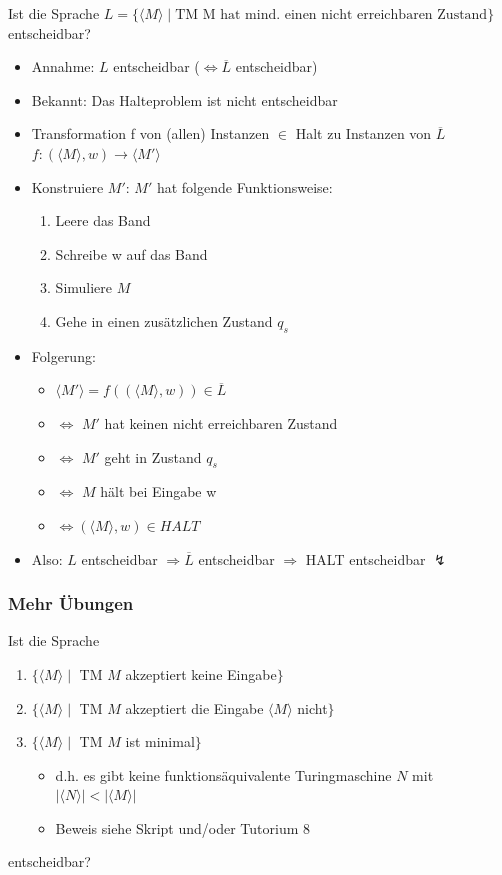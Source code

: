 \begin{frame}
\vspace{-1 cm}
Ist die Sprache $L=\{\langle M \rangle \mid \text{TM M hat mind. einen nicht erreichbaren Zustand}\}$ entscheidbar?
\begin{itemize}
	\item Annahme: $L$ entscheidbar ($\Leftrightarrow \overline{L}$ entscheidbar)
	\item Bekannt: Das Halteproblem ist nicht entscheidbar
	\item Transformation f von (allen) Instanzen $\in$ Halt zu Instanzen von $\overline{L}$~\\ $f:(\langle M \rangle, w) \rightarrow \langle M' \rangle$
	\item Konstruiere $M'$: $M'$ hat folgende Funktionsweise:
	\begin{enumerate}
		\item Leere das Band
		\item Schreibe w auf das Band
		\item Simuliere $M$
		\item Gehe in einen zusätzlichen Zustand $q_s$
	\end{enumerate}
	\item Folgerung:
	\begin{itemize}
		\item $\langle M' \rangle = f((\langle M \rangle, w)) \in \overline{L}$
		\item $\Leftrightarrow$ $M'$ hat keinen nicht erreichbaren Zustand
		\item $\Leftrightarrow$ $M'$ geht in Zustand $q_s$
		\item $\Leftrightarrow$ $M$ hält bei Eingabe w
		\item $\Leftrightarrow (\langle M \rangle, w) \in HALT$
	\end{itemize}
	\item Also: $L$ entscheidbar $\Rightarrow \overline{L}$ entscheidbar $\Rightarrow$ HALT entscheidbar $\lightning$
\end{itemize}
\end{frame}

\begin{frame}
	\frametitle{Mehr Übungen}
	Ist die Sprache
	\begin{enumerate}[$L_1 =$]
		\item $\{\langle M \rangle \mid$ TM $M$ akzeptiert keine Eingabe$\}$
		\item $\{\langle M \rangle \mid$ TM $M$ akzeptiert die Eingabe $\langle M \rangle$ nicht$\}$
		\item $\{\langle M \rangle \mid$ TM $M$ ist minimal$\}$
		\begin{itemize}
			\item[] d.h. es gibt keine funktionsäquivalente Turingmaschine $N$ mit $|\langle N \rangle | < |\langle M \rangle |$
			\item Beweis siehe Skript und/oder Tutorium 8
		\end{itemize}
	\end{enumerate}
	entscheidbar?
\end{frame}

